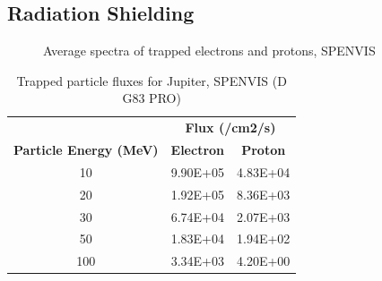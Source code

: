 \subsection{Radiation Shielding}
\begin{figure}[htb]
\captionsetup[subfigure]{width=0.45\textwidth}
 
\caption{Average spectra of trapped electrons and protons, SPENVIS}
\label{fig:image2}
\end{figure}

\begin{table}[htbp]
  \centering
    \begin{tabular}{|c|c|c|}
    \hline
    \textbf{} & \multicolumn{2}{c|}{\textbf{Flux (/cm2/s)}} \bigstrut\\
\cline{2-3}    \textbf{Particle Energy (MeV)} & \textbf{Electron} & \textbf{Proton} \bigstrut\\
    \hline
    10    & 9.90E+05 & 4.83E+04 \bigstrut\\
    \hline
    20    & 1.92E+05 & 8.36E+03 \bigstrut\\
    \hline
    30    & 6.74E+04 & 2.07E+03 \bigstrut\\
    \hline
    50    & 1.83E+04 & 1.94E+02 \bigstrut\\
    \hline
    100   & 3.34E+03 & 4.20E+00 \bigstrut\\
    \hline
    \end{tabular}%
  \label{tab:particle_flux}%
  \caption{Trapped particle fluxes for Jupiter, SPENVIS (D G83 PRO)}
\end{table}%

